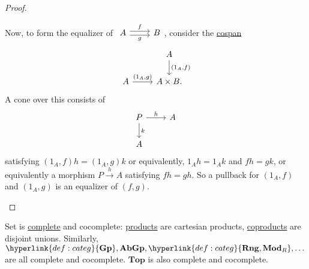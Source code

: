 \documentclass{article}
\newcommand{\named}[1]{\textbf{#1}\index{#1}}
\begin{document}
\begin{proof}
\begin{enumerate}[label=(\roman*)]
    Now, to form the equalizer of $\begin{tikzcd}A \rar[shift left]{f} \rar[shift right,']{g} & B\end{tikzcd}$, consider the \hyperlink{def:span}{cospan}
    \begin{equation*}
      \begin{tikzcd}
        &A \dar{(1_A,f)} \\
        A \rar{(1_A, g)} & A \times B.
      \end{tikzcd}
    \end{equation*}
    A cone over this consists of
    \begin{equation*}
      \begin{tikzcd}
      P \rar{h} \dar{k} & A \\ A
      \end{tikzcd}
    \end{equation*}
    satisfying $(1_A, f) h = (1_A, g) k$ or equivalently, $1_A h = 1_A k$ and $fh = gk$, or equivalently a morphism $P \xrightarrow{h} A$ satisfying $fh = gh$.
    So a pullback for $(1_A,f)$ and $(1_A, g)$ is an equalizer of $(f,g)$. \qedhere
   \end{enumerate}
\end{proof}
Set is \hyperlink{def:complete}{complete} and cocomplete: \hyperlink{def:lprod}{products} are cartesian products, \hyperlink{def:lcoprod}{coproducts} are disjoint unions.
Similarly, $\hyperlink{def:categ}{\mathbf{Gp}}, \mathbf{AbGp}, \hyperlink{def:categ}{\mathbf{Rng}, \mathbf{Mod}_R}, \dotsc$ are all complete and cocomplete.
$\mathbf{Top}$ is also complete and cocomplete.
\end{document}
